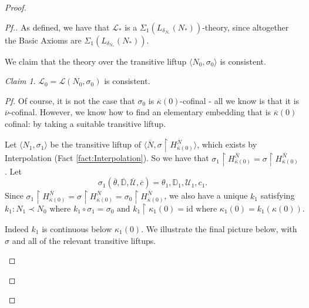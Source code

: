 \documentclass{amsart}
\theoremstyle{definition}
\theoremstyle{remark}
\newtheorem{claimno}{Claim}
\newcommand{\D}{\mathbb{D}}
\newcommand{\N}{{\overline{N}}}
\newcommand{\U}{\mathcal{U}}
\DeclareMathOperator{\otp}{otp}
\newcommand{\rest}{\mathbin{\upharpoonright}}
\begin{document}
\begin{proof}
\begin{proof}[Pf.]
As defined, we have that $\mathcal L_*$ is a $\Sigma_1(L_{\delta_{N_*}}(N_*))$-theory, since altogether the \textsf{Basic Axioms} are $\Sigma_1(L_{\delta_{N_*}}(N_*))$.

We claim that the theory over the transitive liftup $\langle N_0, \sigma_0\rangle$ is consistent.

\begin{claimno} $\mathcal L_0=\mathcal L(N_0, \sigma_0)$ is consistent. \end{claimno}
\begin{proof}[Pf] Of course, it is not the case that $\sigma_0$ is $\overline \kappa(0)$-cofinal - all we know is that it is $\overline \nu$-cofinal. However, we know how to find an elementary embedding that is $\overline \kappa(0)$ cofinal: by taking a suitable transitive liftup.

Let $\langle N_1, \sigma_1 \rangle$ be the transitive liftup of $\langle \N, \sigma \rest H^{\N}_{\overline \kappa(0)} \rangle$, which exists by Interpolation (Fact \ref{fact:Interpolation}). So we have that $\sigma_1 \rest H^\N_{\overline \kappa(0)} = \sigma \rest H^\N_{\overline \kappa(0)}$. Let $$\sigma_1(\overline \theta, \overline{\D}, \overline{\U}, \overline c) = \theta_1, \D_1, \U_1, c_1.$$ 
Since $\sigma_1 \rest H^\N_{\overline \kappa(0)} = \sigma \rest H^\N_{\overline \kappa(0)} = \sigma_0 \rest H^\N_{\overline \kappa(0)}$, we also have a unique $k_1$ satisfying $$ \text{$k_1: N_1 \prec N_0$ where $k_1\circ \sigma_1 = \sigma_0$ and $k_1 \rest \kappa_1(0) = \text{id}$ where $\kappa_1(0)=k_1(\kappa(0))$.}$$ 

Indeed $k_1$ is continuous below $\kappa_1(0)$. We illustrate the final picture below, with $\sigma$ and all of the relevant transitive liftups.
\begin{center}
\end{center}
\end{proof}
\end{proof}
\end{proof}
\end{document}
